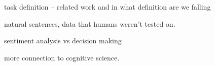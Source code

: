 

task definition -- related work and in what definition are we falling

natural sentences, data that humans weren't tested on.

sentiment analysis vs decision making

more connection to cognitive science.
